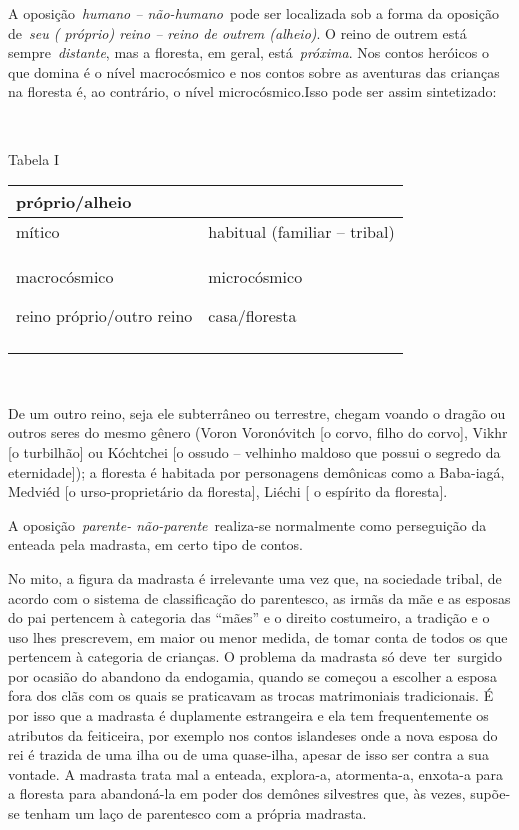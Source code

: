 A oposição~\emph{humano -- não-humano}~pode ser localizada sob a forma
da oposição de~\emph{seu ( próprio) reino -- reino de outrem (alheio)}.
O reino de outrem está sempre~\emph{distante}, mas a floresta, em geral,
está~\emph{próxima}. Nos contos heróicos o que domina é o nível
macrocósmico e nos contos sobre as aventuras das crianças na floresta é,
ao contrário, o nível microcósmico.Isso pode ser assim sintetizado:

~

Tabela I

\begin{longtable}[]{@{}ll@{}}
\toprule
próprio/alheio\tabularnewline
\midrule
\endhead
mítico & habitual (familiar -- tribal)\tabularnewline
\begin{minipage}[t]{0.48\columnwidth}\raggedright\strut
macrocósmico

reino próprio/outro reino\strut
\end{minipage} & \begin{minipage}[t]{0.48\columnwidth}\raggedright\strut
microcósmico

casa/floresta\strut
\end{minipage}\tabularnewline
&\tabularnewline
\bottomrule
\end{longtable}

~

De um outro reino, seja ele subterrâneo ou terrestre, chegam voando o
dragão ou outros seres do mesmo gênero (Voron Voronóvitch {[}o corvo,
filho do corvo{]}, Vikhr {[}o turbilhão{]} ou Kóchtchei {[}o ossudo --
velhinho maldoso que possui o segredo da eternidade{]}); a floresta é
habitada por personagens demônicas como a Baba-iagá, Medviéd {[}o
urso-proprietário da floresta{]}, Liéchi {[} o espírito da floresta{]}.

A oposição~\emph{parente- não-parente}~realiza-se normalmente como
perseguição da enteada pela madrasta, em certo tipo de contos.

No mito, a figura da madrasta é irrelevante uma vez que, na sociedade
tribal, de acordo com o sistema de classificação do parentesco, as irmãs
da mãe e as esposas do pai pertencem à categoria das ``mães'' e o
direito costumeiro, a tradição e o uso lhes prescrevem, em maior ou
menor medida, de tomar conta de todos os que pertencem à categoria de
crianças. O problema da madrasta só deve~ter~surgido por ocasião do
abandono da endogamia, quando se começou a escolher a esposa fora dos
clãs com os quais se praticavam as trocas matrimoniais tradicionais. É
por isso que a madrasta é duplamente estrangeira e ela tem
frequentemente os atributos da feiticeira, por exemplo nos contos
islandeses onde a nova esposa do rei é trazida de uma ilha ou de uma
quase-ilha, apesar de isso ser contra a sua vontade. A madrasta trata
mal a enteada, explora-a, atormenta-a, enxota-a para a floresta para
abandoná-la em poder dos demônes silvestres que, às vezes, supõe-se
tenham um laço de parentesco com a própria madrasta.

